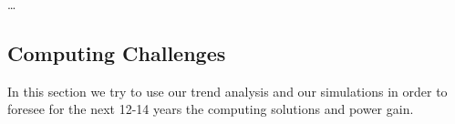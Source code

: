 \dots

\FloatBarrier
\subsection{Computing Challenges}

In this section we try to use our trend analysis and our simulations in order to foresee for the next 12-14 years the computing solutions and power gain.  

%
%

